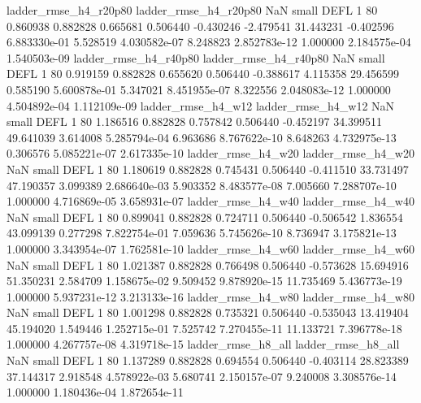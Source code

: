    ladder_rmse_h4_r20p80    ladder_rmse_h4_r20p80                   NaN      small     DEFL                 1 80 0.860938       0.882828 0.665681       0.506440   -0.430246     -2.479541     31.443231    -0.402596   6.883330e-01  5.528519 4.030582e-07     8.248823   2.852783e-12            1.000000    2.184575e-04        1.540503e-09
   ladder_rmse_h4_r40p80    ladder_rmse_h4_r40p80                   NaN      small     DEFL                 1 80 0.919159       0.882828 0.655620       0.506440   -0.388617      4.115358     29.456599     0.585190   5.600878e-01  5.347021 8.451955e-07     8.322556   2.048083e-12            1.000000    4.504892e-04        1.112109e-09
      ladder_rmse_h4_w12       ladder_rmse_h4_w12                   NaN      small     DEFL                 1 80 1.186516       0.882828 0.757842       0.506440   -0.452197     34.399511     49.641039     3.614008   5.285794e-04  6.963686 8.767622e-10     8.648263   4.732975e-13            0.306576    5.085221e-07        2.617335e-10
      ladder_rmse_h4_w20       ladder_rmse_h4_w20                   NaN      small     DEFL                 1 80 1.180619       0.882828 0.745431       0.506440   -0.411510     33.731497     47.190357     3.099389   2.686640e-03  5.903352 8.483577e-08     7.005660   7.288707e-10            1.000000    4.716869e-05        3.658931e-07
      ladder_rmse_h4_w40       ladder_rmse_h4_w40                   NaN      small     DEFL                 1 80 0.899041       0.882828 0.724711       0.506440   -0.506542      1.836554     43.099139     0.277298   7.822754e-01  7.059636 5.745626e-10     8.736947   3.175821e-13            1.000000    3.343954e-07        1.762581e-10
      ladder_rmse_h4_w60       ladder_rmse_h4_w60                   NaN      small     DEFL                 1 80 1.021387       0.882828 0.766498       0.506440   -0.573628     15.694916     51.350231     2.584709   1.158675e-02  9.509452 9.878920e-15    11.735469   5.436773e-19            1.000000    5.937231e-12        3.213133e-16
      ladder_rmse_h4_w80       ladder_rmse_h4_w80                   NaN      small     DEFL                 1 80 1.001298       0.882828 0.735321       0.506440   -0.535043     13.419404     45.194020     1.549446   1.252715e-01  7.525742 7.270455e-11    11.133721   7.396778e-18            1.000000    4.267757e-08        4.319718e-15
      ladder_rmse_h8_all       ladder_rmse_h8_all                   NaN      small     DEFL                 1 80 1.137289       0.882828 0.694554       0.506440   -0.403114     28.823389     37.144317     2.918548   4.578922e-03  5.680741 2.150157e-07     9.240008   3.308576e-14            1.000000    1.180436e-04        1.872654e-11
